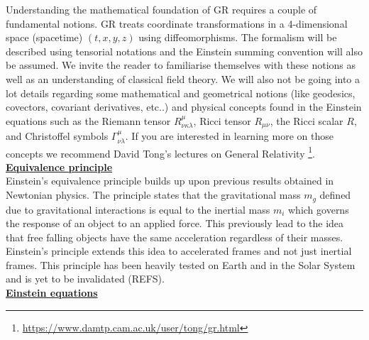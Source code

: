 Understanding the mathematical foundation of GR requires a couple of fundamental notions. GR treats coordinate transformations in a 4-dimensional space (spacetime) $(t, x, y, z)$ 
using diffeomorphisms. The formalism will be described using tensorial notations and the Einstein summing convention will also be assumed. We invite the reader to 
familiarise themselves with these notions as well as an understanding of classical field theory. We will also not be going into a lot details 
regarding some mathematical and geometrical notions (like geodesics, covectors, covariant derivatives, etc..) 
and physical concepts found in the Einstein equations such as the Riemann tensor $R^{\mu}_{\nu \kappa \lambda}$, 
Ricci tensor $R_{\mu \nu}$, the Ricci scalar $R$, and Christoffel symbols $\Gamma ^{\mu}_{\nu \lambda}$. If you are interested in learning more on those concepts we 
recommend David Tong's lectures on General Relativity \footnote{\url{https://www.damtp.cam.ac.uk/user/tong/gr.html}}. \\

\noindent \textbf{\underline{Equivalence principle}} \\

Einstein's equivalence principle builds up upon previous results obtained in Newtonian physics. The principle states that the gravitational mass $m_g$ defined due to 
gravitational interactions is equal to the inertial mass $m_i$ which governs the response of an object to an applied force. This previously lead to the idea that free falling objects have 
the same acceleration regardless of their masses. Einstein's principle extends this idea to accelerated frames and not just inertial frames. This principle has been heavily tested 
on Earth and in the Solar System and is yet to be invalidated (REFS). \\


\noindent \textbf{\underline{Einstein equations}} \\


